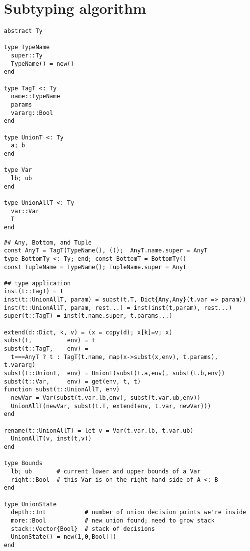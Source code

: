 \chapter{Subtyping algorithm}

\begin{singlespace}
\begin{multicols}{2}
\begin{lstlisting}[style=customjulia]
abstract Ty

type TypeName
  super::Ty
  TypeName() = new()
end

type TagT <: Ty
  name::TypeName
  params
  vararg::Bool
end

type UnionT <: Ty
  a; b
end

type Var
  lb; ub
end

type UnionAllT <: Ty
  var::Var
  T
end
\end{lstlisting}
\end{multicols}

\vspace{-3ex}
\begin{lstlisting}[style=customjulia]
## Any, Bottom, and Tuple
const AnyT = TagT(TypeName(), ());  AnyT.name.super = AnyT
type BottomTy <: Ty; end; const BottomT = BottomTy()
const TupleName = TypeName(); TupleName.super = AnyT

## type application
inst(t::TagT) = t
inst(t::UnionAllT, param) = subst(t.T, Dict{Any,Any}(t.var => param))
inst(t::UnionAllT, param, rest...) = inst(inst(t,param), rest...)
super(t::TagT) = inst(t.name.super, t.params...)

extend(d::Dict, k, v) = (x = copy(d); x[k]=v; x)
subst(t,          env) = t
subst(t::TagT,    env) =
  t===AnyT ? t : TagT(t.name, map(x->subst(x,env), t.params), t.vararg)
subst(t::UnionT,  env) = UnionT(subst(t.a,env), subst(t.b,env))
subst(t::Var,     env) = get(env, t, t)
function subst(t::UnionAllT, env)
  newVar = Var(subst(t.var.lb,env), subst(t.var.ub,env))
  UnionAllT(newVar, subst(t.T, extend(env, t.var, newVar)))
end

rename(t::UnionAllT) = let v = Var(t.var.lb, t.var.ub)
  UnionAllT(v, inst(t,v))
end

type Bounds
  lb; ub       # current lower and upper bounds of a Var
  right::Bool  # this Var is on the right-hand side of A <: B
end

type UnionState
  depth::Int           # number of union decision points we're inside
  more::Bool           # new union found; need to grow stack
  stack::Vector{Bool}  # stack of decisions
  UnionState() = new(1,0,Bool[])
end


\end{lstlisting}
\end{singlespace}

